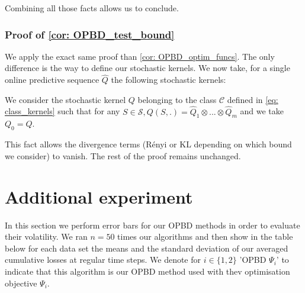 \begin{noaddcontents}
Combining all those facts allows us to conclude.




\subsubsection{Proof of \cref{cor: OPBD_test_bound}}

We apply the exact same proof than \cref{cor: OPBD_optim_funcs}. The only difference is the way to define our stochastic kernels. We now take, for a single online predictive sequence $\hat{Q}$ the following stochastic kernels:

We consider the stochastic kernel $Q$ belonging to the class $\mathcal{C}$ defined in \cref{eq: class_kernels} such that for any $S\in\mathcal{S}, Q(S,.) = \hat{Q}_1\otimes ... \otimes \hat{Q}_{m}$ and we take $Q_0=Q$.

This fact allows the divergence terms (Rényi or KL depending on which bound we consider) to vanish. The rest of the proof remains unchanged.


\section{Additional experiment}
\label{sec: error_bars}

In this section we perform error bars for our OPBD methods in order to evaluate their volatility.
We ran $n=50$ times our algorithms and then show in the table below for each data set the means and the standard deviation of our averaged cumulative losses at regular time steps. We denote for $i\in\{1,2\}$ 'OPBD $\Psi_i$' to indicate that this algorithm is our OPBD method used with thev optimisation objective $\Psi_i$.



\end{noaddcontents}
